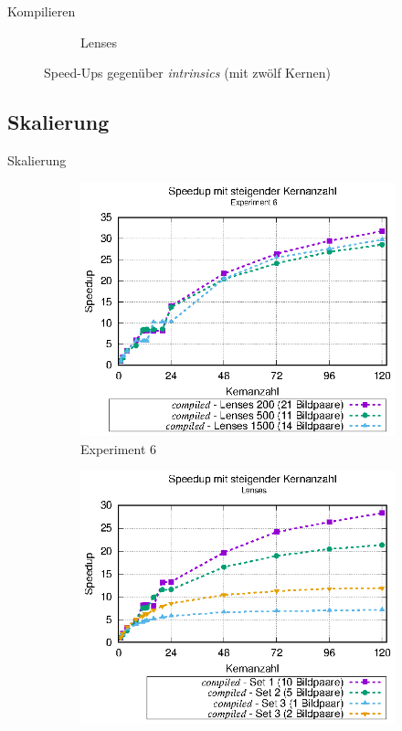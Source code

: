 \begin{frame}{Kompilieren}
\begin{figure}[h]
\begin{subfigure}[b]{0.47\textwidth}
			\caption{Lenses}
		\end{subfigure}
		\caption{Speed-Ups gegenüber \textit{intrinsics} (mit zwölf Kernen)}
	\end{figure}
\end{frame}

\subsection{Skalierung}
\begin{frame}{Skalierung}
	\begin{center}
		\begin{figure}[h]
			\begin{subfigure}[b]{0.45\textwidth}
				\centering
				\includegraphics[width=\textwidth]{pdf/best_speedup_exp6_standalone}
				\caption{Experiment 6}
			\end{subfigure}
			\hfill
			\begin{subfigure}[b]{0.45\textwidth}
				\centering
				\includegraphics[width=\textwidth]{pdf/best_speedup_lenses_standalone}

\end{subfigure}
\end{figure}
\end{center}
\end{frame}
